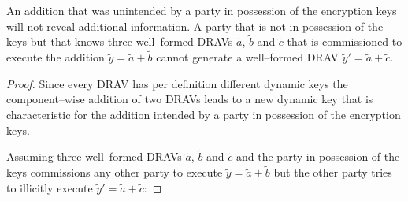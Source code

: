 \begin{lem}
  \label{lem:wrong-add}

  An addition that was unintended by a party in possession of the encryption
  keys will not reveal additional information. A party that is not in possession
  of the keys but that knows three well--formed DRAVs $\widetilde{a}$,
  $\widetilde{b}$ and $\widetilde{c}$ that is commissioned to execute the
  addition $\widetilde{y} = \widetilde{a} + \widetilde{b}$ cannot generate a
  well--formed DRAV $\widetilde{y}' = \widetilde{a} + \widetilde{c}$.

\end{lem}

\begin{proof}

  Since every DRAV has per definition different dynamic keys the
  component--wise addition of two DRAVs leads to a new dynamic key that is
  characteristic for the addition intended by a party in possession of the
  encryption keys.

  Assuming three well--formed DRAVs $\widetilde{a}$, $\widetilde{b}$ and
  $\widetilde{c}$ and the party in possession of the keys commissions any other
  party to execute $\widetilde{y} = \widetilde{a} + \widetilde{b}$ but the other
  party tries to illicitly execute $\widetilde{y}' = \widetilde{a} +
  \widetilde{c}$:


\end{proof}
